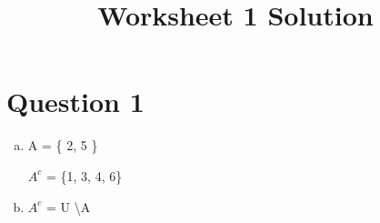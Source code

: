 \documentclass[12pt]{article}
\begin{document}
\title{Worksheet 1 Solution}
\maketitle

\section*{Question 1}

\begin{enumerate}[a)]
    \item
        A = \{ 2, 5 \}

        $A^c$ = \{1, 3, 4, 6\}

    \bigskip

    \item
        $A^c$ = U \textbackslash A
\end{enumerate}
\end{document}
